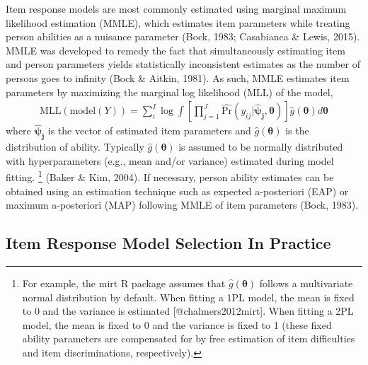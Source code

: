 \documentclass[
  english,
  man,floatsintext]{apa7}
\begin{document}
Item response models are most commonly estimated using marginal maximum likelihood estimation (MMLE), which estimates item parameters while treating person abilities as a nuisance parameter (Bock, 1983; Casabianca \& Lewis, 2015). MMLE was developed to remedy the fact that simultaneously estimating item and person parameters yields statistically inconsistent estimates as the number of persons goes to infinity (Bock \& Aitkin, 1981). As such, MMLE estimates item parameters by maximizing the marginal log likelihood (MLL) of the model,
\begin{align}
\text{MLL}(\text{model}(Y))= \sum_{i}^{I} \log \int \left[\prod_{j=1}^{J} \hat{\text{Pr}}(y_{ij} | \bm{\hat\psi_j}, \bm{\theta}) \right] \hat g(\bm{\theta}) d\bm{\theta}
\end{align}
where \(\bm{\hat\psi_j}\) is the vector of estimated item parameters and \(\hat g(\bm{\theta})\) is the distribution of ability. Typically \(\hat g(\bm{\theta})\) is assumed to be normally distributed with hyperparameters (e.g., mean and/or variance) estimated during model fitting. \footnote{For example, the mirt R package assumes that $\hat g(\bm{\theta})$ follows a multivariate normal distribution by default. When fitting a 1PL model, the mean is fixed to 0 and the variance is estimated [@chalmers2012mirt]. When fitting a 2PL model, the mean is fixed to 0 and the variance is fixed to 1 (these fixed ability parameters are compensated for by free estimation of item difficulties and item discriminations, respectively).} (Baker \& Kim, 2004). If necessary, person ability estimates can be obtained using an estimation technique such as expected a-posteriori (EAP) or maximum a-posteriori (MAP) following MMLE of item parameters (Bock, 1983).

\hypertarget{item-response-model-selection-in-practice}{%
\subsection{Item Response Model Selection In Practice}\label{item-response-model-selection-in-practice}}
\end{document}
